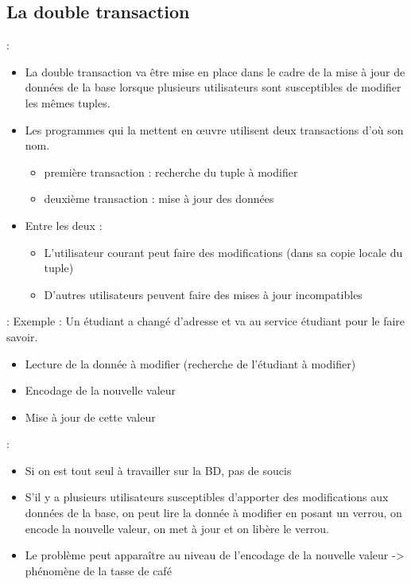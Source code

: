 \documentclass[10pt]{beamer}
\begin{document}
\subsection{La double transaction}
\begin{frame}{\secname : \subsecname}
    \begin{itemize}
        \item  La double transaction va être mise en place dans le cadre de la mise à jour de données de la base lorsque plusieurs utilisateurs sont susceptibles de modifier les mêmes tuples.
        \item Les programmes qui la mettent en œuvre utilisent deux transactions d'où son nom.
              \begin{itemize}
                  \item première transaction : recherche du tuple à modifier
                  \item deuxième transaction : mise à jour des données
              \end{itemize}
        \item Entre les deux :
              \begin{itemize}
                  \item L'utilisateur courant peut faire des modifications (dans sa copie locale du tuple)
                  \item D'autres utilisateurs peuvent faire des mises à jour incompatibles
              \end{itemize}
    \end{itemize}
\end{frame}

\begin{frame}{\secname : \subsecname}
    Exemple :  Un étudiant a changé d'adresse et va au service étudiant pour le faire savoir.
    \begin{itemize}
        \item Lecture de la donnée à modifier (recherche de l'étudiant à modifier)
        \item Encodage de la nouvelle valeur
        \item Mise à jour de cette valeur
    \end{itemize}
\end{frame}

\begin{frame}{\secname : \subsecname}
    \begin{itemize}
        \item  Si on est tout seul à travailler sur la BD, pas de soucis
        \item S'il y a plusieurs utilisateurs susceptibles d'apporter des modifications aux données de la base, on peut lire la donnée à modifier en posant un verrou, on encode la nouvelle valeur, on met à jour et on libère le verrou.
        \item Le problème peut apparaître au niveau de l'encodage de la nouvelle valeur -> phénomène de la tasse de café
    \end{itemize}
\end{frame}
\end{document}
